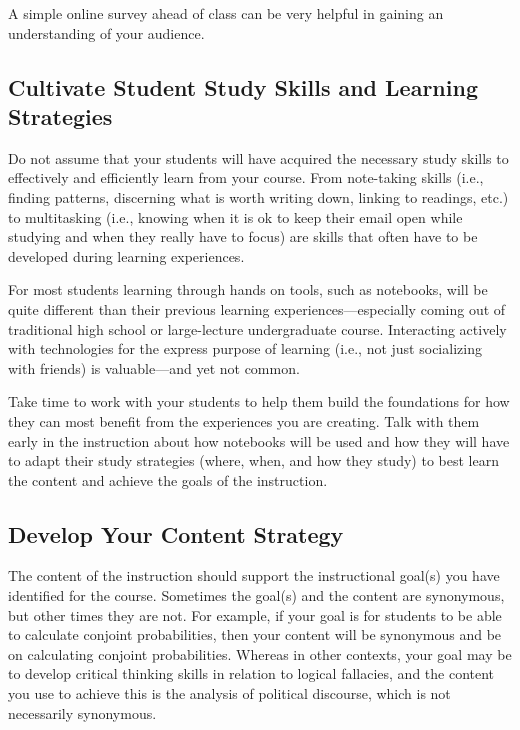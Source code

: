 \documentclass[]{book}
\begin{document}
A simple online survey ahead of class can be very helpful in gaining an
understanding of your audience.

\subsection{Cultivate Student Study Skills and Learning
Strategies}\label{cultivate-student-study-skills-and-learning-strategies}

Do not assume that your students will have acquired the necessary study
skills to effectively and efficiently learn from your course. From
note-taking skills (i.e., finding patterns, discerning what is worth
writing down, linking to readings, etc.) to multitasking (i.e., knowing
when it is ok to keep their email open while studying and when they
really have to focus) are skills that often have to be developed during
learning experiences.

For most students learning through hands on tools, such as notebooks,
will be quite different than their previous learning
experiences---especially coming out of traditional high school or
large-lecture undergraduate course. Interacting actively with
technologies for the express purpose of learning (i.e., not just
socializing with friends) is valuable---and yet not common.

Take time to work with your students to help them build the foundations
for how they can most benefit from the experiences you are creating.
Talk with them early in the instruction about how notebooks will be used
and how they will have to adapt their study strategies (where, when, and
how they study) to best learn the content and achieve the goals of the
instruction.

\subsection{Develop Your Content
Strategy}\label{develop-your-content-strategy}

The content of the instruction should support the instructional goal(s)
you have identified for the course. Sometimes the goal(s) and the
content are synonymous, but other times they are not. For example, if
your goal is for students to be able to calculate conjoint
probabilities, then your content will be synonymous and be on
calculating conjoint probabilities. Whereas in other contexts, your goal
may be to develop critical thinking skills in relation to logical
fallacies, and the content you use to achieve this is the analysis of
political discourse, which is not necessarily synonymous.
\end{document}
